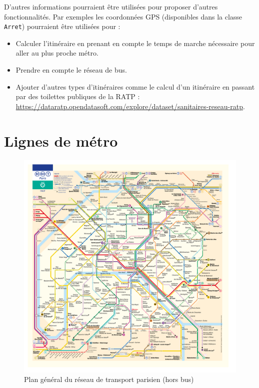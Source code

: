\documentclass[,french]{article}
\begin{document}
D'autres informations pourraient être utilisées pour proposer d'autres
fonctionnalités. Par exemples les coordonnées GPS (disponibles dans la
classe \texttt{Arret}) pourraient être utilisées pour :

\begin{itemize}
\item
  Calculer l'itinéraire en prenant en compte le temps de marche
  nécessaire pour aller au plus proche métro.
\item
  Prendre en compte le réseau de bus.
\item
  Ajouter d'autres types d'itinéraires comme le calcul d'un itinéraire
  en passant par des toilettes publiques de la RATP :
  \url{https://dataratp.opendatasoft.com/explore/dataset/sanitaires-reseau-ratp}.
\end{itemize}

\hypertarget{sec:lignes_metro}{%
\section{Lignes de métro}\label{sec:lignes_metro}}

\begin{figure}
\centering
\includegraphics{img/plan_lignes/Plan-Metro.pdf}
\caption{Plan général du réseau de transport parisien (hors bus)}
\end{figure}
\end{document}
